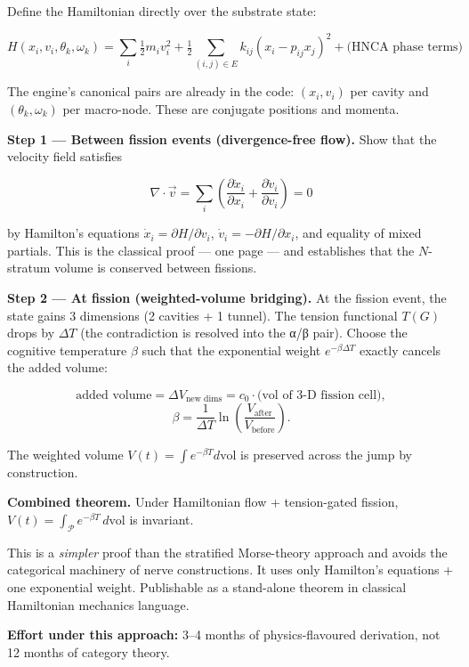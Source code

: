 \documentclass[
  11pt,
  a4paper,
]{article}
\begin{document}
Define the Hamiltonian directly over the substrate state:

\[
H(x_i, v_i, \theta_k, \omega_k) = \sum_i \tfrac{1}{2} m_i v_i^2
                                + \tfrac{1}{2} \sum_{(i,j) \in E} k_{ij}(x_i - p_{ij} x_j)^2
                                + \text{(HNCA phase terms)}
\]

The engine's canonical pairs are already in the code: \((x_i, v_i)\) per
cavity and \((\theta_k, \omega_k)\) per macro-node. These are conjugate
positions and momenta.

\textbf{Step 1 --- Between fission events (divergence-free flow).} Show
that the velocity field satisfies

\[
\nabla \cdot \vec{v} = \sum_i \left(\frac{\partial \dot{x}_i}{\partial x_i} + \frac{\partial \dot{v}_i}{\partial v_i}\right) = 0
\]

by Hamilton's equations \(\dot{x}_i = \partial H/\partial v_i\),
\(\dot{v}_i = -\partial H/\partial x_i\), and equality of mixed
partials. This is the classical proof --- one page --- and establishes
that the \(N\)-stratum volume is conserved between fissions.

\textbf{Step 2 --- At fission (weighted-volume bridging).} At the
fission event, the state gains 3 dimensions (2 cavities + 1 tunnel). The
tension functional \(T(G)\) drops by \(\Delta T\) (the contradiction is
resolved into the α/β pair). Choose the cognitive temperature \(\beta\)
such that the exponential weight \(e^{-\beta \Delta T}\) exactly cancels
the added volume:

\[
\text{added volume} = \Delta V_\text{new dims} = c_0 \cdot \text{(vol of 3-D fission cell)},
\] \[
\beta = \frac{1}{\Delta T} \ln\!\left(\frac{V_\text{after}}{V_\text{before}}\right).
\]

The weighted volume \(V(t) = \int e^{-\beta T} d\text{vol}\) is
preserved across the jump by construction.

\textbf{Combined theorem.} Under Hamiltonian flow + tension-gated
fission, \(V(t) = \int_{\mathcal{P}} e^{-\beta T} \, d\text{vol}\) is
invariant.

This is a \emph{simpler} proof than the stratified Morse-theory approach
and avoids the categorical machinery of nerve constructions. It uses
only Hamilton's equations + one exponential weight. Publishable as a
stand-alone theorem in classical Hamiltonian mechanics language.

\textbf{Effort under this approach:} 3--4 months of physics-flavoured
derivation, not 12 months of category theory.
\end{document}
